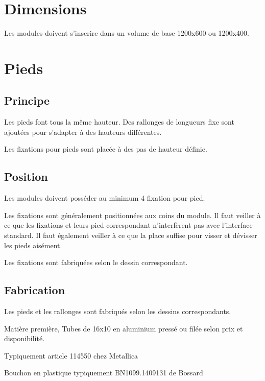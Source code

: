 
\section{Dimensions}

Les modules doivent s'inscrire dans un volume de base 1200x600 ou 1200x400.

\section{Pieds}

\subsection{Principe}

Les pieds font tous la même hauteur.
Des rallonges de longueurs fixe sont ajoutées pour s'adapter à des hauteurs différentes.

Les fixations pour pieds sont placée à des pas de hauteur définie.

\subsection{Position}

Les modules doivent posséder au minimum 4 fixation pour pied.

Les fixations sont généralement positionnées aux coins du module.
Il faut veiller à ce que les fixations et leurs pied correspondant n'interfèrent pas avec l'interface standard. 
Il faut également veiller à ce que la place suffise pour visser et dévisser les pieds aisément.

Les fixations sont fabriquées selon le dessin correspondant.

\subsection{Fabrication}


Les pieds et les rallonges sont fabriqués selon les dessins correspondants.

Matière première, Tubes de 16x10 en aluminium pressé ou filée selon prix et disponibilité.

Typiquement article 114550 chez Metallica

Bouchon en plastique typiquement BN1099.1409131 de Bossard


